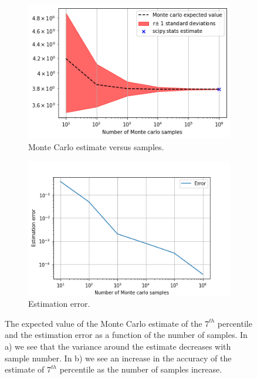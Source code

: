 \documentclass{article}
\begin{document}
\begin{figure}[!htb]
     \centering
     \begin{subfigure}[b]{0.45\textwidth}
         \centering
         \includegraphics[width=\textwidth]{Q1a_fig9.png}
         \caption{Monte Carlo estimate versus samples.}
     \end{subfigure}
     \hfill
     \begin{subfigure}[b]{0.45\textwidth}
         \centering
         \includegraphics[width=\textwidth]{Q1a_fig10.png}
         \caption{Estimation error.}
     \end{subfigure}
        \caption{The expected value of the Monte Carlo estimate of the $7^{th}$ percentile and the estimation error as a function of the number of samples. In a) we see that the variance around the estimate decreases with sample number. In b) we see an increase in the accuracy of the estimate of  $7^{th}$ percentile as the number of samples increase.}
        \label{fig:Q1a_6}
\end{figure}
\end{document}
